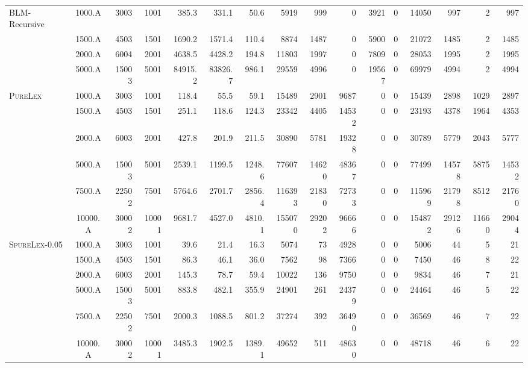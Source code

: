 \documentclass{article}
\begin{document}
\begin{table}[htb]
\begin{tabular}{l|c|rr|rrr|rrrrrr|rrr}
\hline
BLM-Recursive & 1000.A & 3003 & 1001 & 385.3 & 331.1 & 50.6 &  5919 & 999 & 0 & 3921 & 0 & 14050 & 997 & 2 & 997 \\
& 1500.A & 4503 & 1501 & 1690.2 & 1571.4 & 110.4 &  8874 & 1487 & 0 & 5900 & 0 & 21072 & 1485 & 2 & 1485 \\
& 2000.A & 6004 & 2001 & 4638.5 & 4428.2 & 194.8 &  11803 & 1997 & 0 & 7809 & 0 & 28053 & 1995 & 2 & 1995 \\
& 5000.A & 15003 & 5001 & 84915.2 & 83826.7 & 986.1 &  29559 & 4996 & 0 & 19567 & 0 & 69979 & 4994 & 2 & 4994 \\

\hline
\textsc{PureLex} & 1000.A & 3003 & 1001 & 118.4 & 55.5 & 59.1 &  15489 & 2901 & 9687 & 0 & 0 & 15439 & 2898 & 1029 & 2897 \\
& 1500.A & 4503 & 1501 & 251.1 & 118.6 & 124.3 &  23342 & 4405 & 14532 & 0 & 0 & 23193 & 4378 & 1964 & 4353 \\
& 2000.A & 6003 & 2001 & 427.8 & 201.9 & 211.5 &  30890 & 5781 & 19328 & 0 & 0 & 30789 & 5779 & 2043 & 5777 \\
& 5000.A & 15003 & 5001 & 2539.1 & 1199.5 & 1248.6 &  77607 & 14620 & 48367 & 0 & 0 & 77499 & 14578 & 5875 & 14532 \\
& 7500.A & 22502 & 7501 & 5764.6 & 2701.7 & 2856.4 &  116393 & 21830 & 72733 & 0 & 0 & 115969 & 21798 & 8512 & 21760 \\
& 10000.A & 30002 & 10001 & 9681.7 & 4527.0 & 4810.1 &  155070 & 29202 & 96666 & 0 & 0 & 154872 & 29126 & 11660 & 29044 \\

\hline
\textsc{SpureLex}-0.05 & 1000.A & 3003 & 1001 & 39.6 & 21.4 & 16.3 &  5074 & 73 & 4928 & 0 & 0 & 5006 & 44 & 5 & 21 \\
& 1500.A & 4503 & 1501 & 86.3 & 46.1 & 36.0 &  7562 & 98 & 7366 & 0 & 0 & 7450 & 46 & 8 & 22 \\
& 2000.A & 6003 & 2001 & 145.3 & 78.7 & 59.4 &  10022 & 136 & 9750 & 0 & 0 & 9834 & 46 & 7 & 21 \\
& 5000.A & 15003 & 5001 & 883.8 & 482.1 & 355.9 &  24901 & 261 & 24379 & 0 & 0 & 24464 & 46 & 5 & 22 \\
& 7500.A & 22502 & 7501 & 2000.3 & 1088.5 & 801.2 &  37274 & 392 & 36490 & 0 & 0 & 36569 & 46 & 7 & 22 \\
& 10000.A & 30002 & 10001 & 3485.3 & 1902.5 & 1389.1 &  49652 & 511 & 48630 & 0 & 0 & 48718 & 46 & 6 & 22 \\
\hline


\end{tabular}
\end{table}
\end{document}
